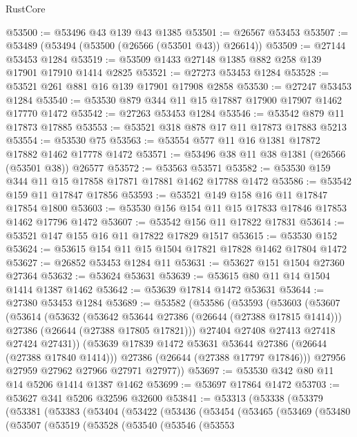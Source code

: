 \begin{lexlean}{RustCore}
\begin{coremodule}
@53500 := @53496 @43 @139 @43 @1385
@53501 := @26567 @53453
@53507 := @53489 (@53494 (@53500 (@26566 (@53501 @43)) @26614))
@53509 := @27144 @53453 @1284
@53519 := @53509 @1433 @27148 @1385 @882 @258 @139 @17901 @17910 @1414 @2825
@53521 := @27273 @53453 @1284
@53528 := @53521 @261 @881 @16 @139 @17901 @17908 @2858
@53530 := @27247 @53453 @1284
@53540 := @53530 @879 @344 @11 @15 @17887 @17900 @17907 @1462 @17770 @1472
@53542 := @27263 @53453 @1284
@53546 := @53542 @879 @11 @17873 @17885
@53553 := @53521 @318 @878 @17 @11 @17873 @17883 @5213
@53554 := @53530 @75
@53563 := @53554 @577 @11 @16 @1381 @17872 @17882 @1462 @17778 @1472
@53571 := @53496 @38 @11 @38 @1381 (@26566 (@53501 @38)) @26577
@53572 := @53563 @53571
@53582 := @53530 @159 @344 @11 @15 @17858 @17871 @17881 @1462 @17788 @1472
@53586 := @53542 @159 @11 @17847 @17856
@53593 := @53521 @149 @158 @16 @11 @17847 @17854 @1800
@53603 := @53530 @156 @154 @11 @15 @17833 @17846 @17853 @1462 @17796 @1472
@53607 := @53542 @156 @11 @17822 @17831
@53614 := @53521 @147 @155 @16 @11 @17822 @17829 @1517
@53615 := @53530 @152
@53624 := @53615 @154 @11 @15 @1504 @17821 @17828 @1462 @17804 @1472
@53627 := @26852 @53453 @1284 @11
@53631 := @53627 @151 @1504 @27360 @27364
@53632 := @53624 @53631
@53639 := @53615 @80 @11 @14 @1504 @1414 @1387 @1462
@53642 := @53639 @17814 @1472 @53631
@53644 := @27380 @53453 @1284
@53689 := @53582
    (@53586
      (@53593
        (@53603
          (@53607
            (@53614
              (@53632
                (@53642 @53644 @27386 (@26644 (@27388 @17815 @1414)))
                @27386
                (@26644 (@27388 @17805 @17821)))
              @27404
              @27408
              @27413
              @27418
              @27424
              @27431))
          (@53639 @17839 @1472 @53631 @53644 @27386 (@26644 (@27388 @17840 @1414)))
          @27386
          (@26644 (@27388 @17797 @17846)))
        @27956
        @27959
        @27962
        @27966
        @27971
        @27977))
@53697 := @53530 @342 @80 @11 @14 @5206 @1414 @1387 @1462
@53699 := @53697 @17864 @1472
@53703 := @53627 @341 @5206 @32596 @32600
@53841 := @53313
    (@53338
      (@53379
        (@53381
          (@53383
            (@53404
              (@53422
                (@53436
                  (@53454
                    (@53465
                      (@53469
                        (@53480
                          (@53507
                            (@53519
                              (@53528
                                (@53540
                                  (@53546
                                    (@53553

\end{coremodule}
\end{lexlean}
